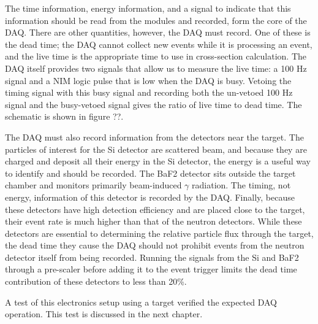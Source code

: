 The time information, energy information, and a signal to indicate that this information should be read from the modules and recorded, form the core of the DAQ.  There are other quantities, however, the DAQ must record.  One of these is the dead time; the DAQ cannot collect new events while it is processing an event, and the live time is the appropriate time to use in cross-section calculation.  The DAQ itself provides two signals that allow us to measure the live time: a 100 Hz signal and a NIM logic pulse that is low when the DAQ is busy.  Vetoing the timing signal with this busy signal and recording both the un-vetoed 100 Hz signal and the busy-vetoed signal gives the ratio of live time to dead time.  The schematic is shown in figure ??.

The DAQ must also record information from the detectors near the target.  The particles of interest for the Si detector are scattered  beam, and because they are charged and deposit all their energy in the Si detector, the energy is a useful way to identify  and should be recorded.  The BaF2 detector sits outside the target chamber and monitors primarily beam-induced $\gamma$ radiation.  The timing, not energy, information of this detector is recorded by the DAQ.  Finally, because these detectors have high detection efficiency and are placed close to the target, their event rate is much higher than that of the neutron detectors.  While these detectors are essential to determining the relative particle flux through the target, the dead time they cause the DAQ should not prohibit events from the neutron detector itself from being recorded.  Running the signals from the Si and BaF2 through a pre-scaler before adding it to the event trigger limits the dead time contribution of these detectors to less than 20\%.

A test of this electronics setup using a  target verified the expected DAQ operation.  This test is discussed in the next chapter. 

%
% 
% 
